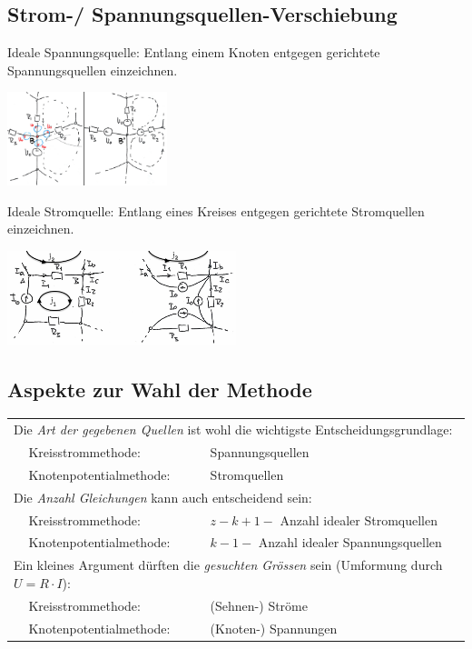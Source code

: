 \subsection{Strom-/ Spannungsquellen-Verschiebung}
\begin{multicols}{2}
Ideale Spannungsquelle: Entlang einem Knoten entgegen gerichtete Spannungsquellen einzeichnen.
\begin{center}
\includegraphics[width=0.35\textwidth]{pics/dcnet/UQuellenver}\\
\end{center}
Ideale Stromquelle: Entlang eines Kreises entgegen gerichtete Stromquellen einzeichnen.
\begin{center}
\includegraphics[width=0.5\textwidth]{pics/dcnet/IQuellenver}\\
\end{center}
\end{multicols}

\subsection{Aspekte zur Wahl der Methode}
\begin{tabular}{lll}
	\multicolumn{3}{l}{Die \textit{Art der gegebenen Quellen} ist wohl die wichtigste Entscheidungsgrundlage:}\\
	&Kreisstrommethode: &Spannungsquellen\\
	&Knotenpotentialmethode: &Stromquellen\\
	\multicolumn{3}{l}{Die \textit{Anzahl Gleichungen} kann auch entscheidend sein:}\\
	&Kreisstrommethode: &$z-k+1-$ Anzahl idealer Stromquellen\\
	&Knotenpotentialmethode: &$k-1-$ Anzahl idealer Spannungsquellen\\
	\multicolumn{3}{l}{Ein kleines Argument dürften die \textit{gesuchten Grössen} sein (Umformung durch $U=R \cdot I$):}\\
	&Kreisstrommethode: &(Sehnen-) Ströme\\
	&Knotenpotentialmethode: &(Knoten-) Spannungen
\end{tabular}
